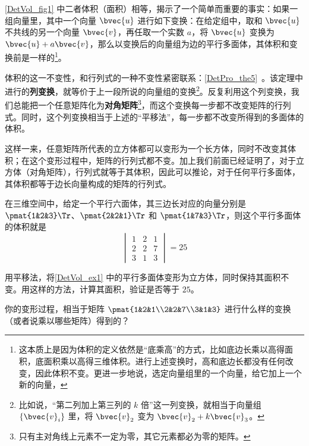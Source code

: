 \autoref{DetVol_fig1} 中二者体积（面积）相等，揭示了一个简单而重要的事实：如果一组向量里，其中一个向量 $\bvec{u}$ 进行如下变换：在给定组中，取和 $\bvec{u}$ 不共线的另一个向量 $\bvec{v}$，再任取一个实数 $a$，将 $\bvec{u}$ 变换为 $\bvec{u}+a\bvec{v}$，那么以变换后的向量组为边的平行多面体，其体积和变换前是一样的\footnote{这本质上是因为体积的定义依然是“底乘高”的方式，比如底边长乘以高得面积，底面积乘以高得三维体积。进行上述变换时，高和底边长都没有任何改变，因此体积不变。更进一步地说，选定向量组里的一个向量，给它加上一个新的向量，}。

体积的这一不变性，和行列式的一种不变性紧密联系：\autoref{DetPro_the5}~。该定理中进行的\textbf{列变换}，就等价于上一段所说的向量组的变换\footnote{比如说，“第二列加上第三列的 $k$ 倍”这一列变换，就相当于向量组 $\{\bvec{v}_i\}$ 里，将 $\bvec{v}_2$ 变为 $\bvec{v}_2+k\bvec{v}_3$。}。反复利用这个列变换，我们总能把一个任意矩阵化为\textbf{对角矩阵}\footnote{只有主对角线上元素不一定为零，其它元素都必为零的矩阵。}，而这个变换每一步都不改变矩阵的行列式。同时，这个列变换相当于上述的“平移法”，每一步都不改变所得到的多面体的体积。

这样一来，任意矩阵所代表的立方体都可以变形为一个长方体，同时不改变其体积；在这个变形过程中，矩阵的行列式都不变。加上我们前面已经证明了，对于立方体（对角矩阵），行列式就等于其体积，因此可以推论，对于任何平行多面体，其体积都等于边长向量构成的矩阵的行列式。

\begin{example}{}\label{DetVol_ex1}
在三维空间中，给定一个平行六面体，其三边长对应的向量分别是 $\pmat{1&2&3}\Tr$、$\pmat{2&2&1}\Tr$ 和 $\pmat{1&7&3}\Tr$，则这个平行多面体的体积就是
\begin{equation}
\begin{vmatrix}
1&2&1\\
2&2&7\\
3&1&3
\end{vmatrix} = 25
\end{equation}
\end{example}

\begin{exercise}{}
用平移法，将\autoref{DetVol_ex1} 中的平行多面体变形为立方体，同时保持其面积不变。用这样的方法，计算其面积，验证是否等于 $25$。

你的变形过程，相当于矩阵 $\pmat{1&2&1\\2&2&7\\3&1&3}$ 进行什么样的变换（或者说乘以哪些矩阵）得到的？
\end{exercise}



